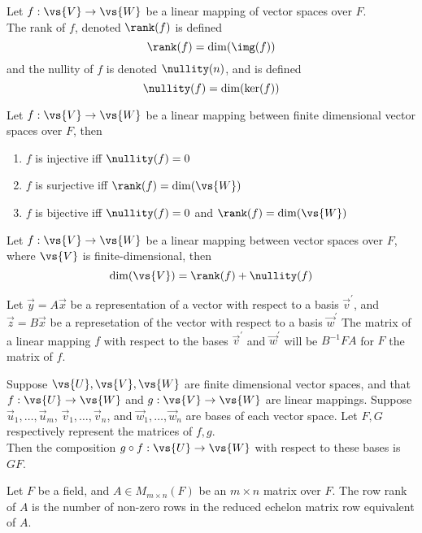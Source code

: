 \begin{definition}
  Let $f: \vs{V} \to \vs{W}$ be a linear mapping of vector spaces over
  $F$.\\
  The rank of $f$, denoted $\rank(f)$ is defined \[ \rank(f) =
  \dim(\img(f)) \] and the nullity of $f$ is denoted $\nullity(n)$,
  and is defined \[ \nullity(f) = \dim(\ker(f)) \]
\end{definition}
\begin{lemma}
  Let $f: \vs{V} \to \vs{W}$ be a linear mapping between finite
  dimensional vector spaces over $F$, then
  \begin{enumerate}
  \item $f$ is injective iff $\nullity(f)=0$
  \item $f$ is surjective iff $\rank(f) = \dim(\vs{W})$
  \item $f$ is bijective iff $\nullity(f) = 0$ and $\rank(f) =
    \dim(\vs{W})$
  \end{enumerate}
\end{lemma}
\begin{theorem}
  Let $f: \vs{V} \to \vs{W}$ be a linear mapping between vector spaces
  over $F$, where $\vs{V}$ is finite-dimensional, then 
  \[ \dim(\vs{V}) = \rank(f) + \nullity(f) \]
\end{theorem}
\begin{lemma}
  Let $ \vec{y} = A \vec{x}$ be a representation of a vector with
  respect to a basis $\vec{v}^{\prime}$, and $\vec{z} = B \vec{x}$ be
  a represetation of the vector with respect to a basis
  $\vec{w}^{\prime}$ The matrix of a linear mapping $f$ with respect
  to the bases $\vec{v}^{\prime}$ and $\vec{w}^{\prime}$ will be
  $B^{-1} F A$ for $F$ the matrix of $f$.
\end{lemma}
\begin{lemma}
  Suppose $\vs{U}, \vs{V}, \vs{W}$ are finite dimensional vector
  spaces, and that $f:\vs{U} \to \vs{W}$ and $g:\vs{V} \to \vs{W}$ are
  linear mappings. Suppose $\vec{u}_1, \dots, \vec{u}_m$, $\vec{v}_1,
  \dots, \vec{v}_n$, and $\vec{w}_1, \dots, \vec{w}_n$ are bases of
  each vector space. Let $F, G$ respectively represent the matrices of
  $f, g$.\\ Then the composition $g \circ f: \vs{U} \to \vs{W}$ with
  respect to these bases is $GF$.
\end{lemma}
\begin{definition}
  Let $F$ be a field, and $A \in M_{m \times n}(F)$ be an $m \times n$
  matrix over $F$. The row rank of $A$ is the number of non-zero rows
  in the reduced echelon matrix row equivalent of $A$.
\end{definition}
